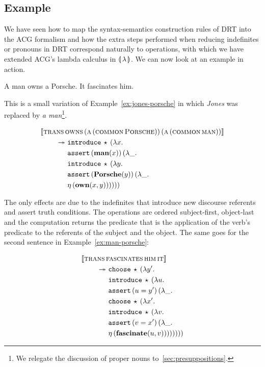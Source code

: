 \subsection{Example}
\label{ssec:dynamic-example}

We have seen how to map the syntax-semantics construction rules of DRT into
the ACG formalism and how the extra steps performed when reducing
indefinites or pronouns in DRT correspond naturally to operations, with
which we have extended ACG's lambda calculus in $\llparenthesis \, \lambda \, \rrparenthesis$. We can
now look at an example in action.

\begin{exe}
  \ex \label{ex:man-porsche} A man owns a Porsche. It fascinates him.
\end{exe}

This is a small variation of Example~\ref{ex:jones-porsche} in which
\emph{Jones} was replaced by \emph{a man}\footnote{We relegate the
  discussion of proper nouns to~\ref{sec:presuppositions}.}.

\begin{align*}
  \llbracket \textsc{trans}\,&\textsc{owns}\,(\textsc{a}\,(\textsc{common}\,\textsc{Porsche}))\,(\textsc{a}\,(\textsc{common}\,\textsc{man})) \rrbracket \\
  \twoheadrightarrow &\ \mathtt{introduce}\,\star\,(\lambda x.\,  \\
       &\ \mathtt{assert}\,(\textbf{man}(x))\,(\lambda \_.\,  \\
       &\ \mathtt{introduce}\,\star\,(\lambda y.\,  \\
       &\ \mathtt{assert}\,(\textbf{Porsche}(y))\,(\lambda \_.\,  \\
       &\ \eta\,(\textbf{own}(x, y))))))
\end{align*}

The only effects are due to the indefinites that introduce new discourse
referents and assert truth conditions. The operations are ordered
subject-first, object-last and the computation returns the predicate that
is the application of the verb's predicate to the referents of the subject
and the object. The same goes for the second sentence in
Example~\ref{ex:man-porsche}:

\begin{align*}
  \llbracket \textsc{trans}\,&\textsc{fascinates}\,\textsc{him}\,\textsc{it} \rrbracket \\
  \twoheadrightarrow &\ \mathtt{choose}\,\star\,(\lambda y'.\,  \\
       &\ \mathtt{introduce}\,\star\,(\lambda u.\,  \\
       &\ \mathtt{assert}\,(u = y')\,(\lambda \_.\,  \\
       &\ \mathtt{choose}\,\star\,(\lambda x'.\,  \\
       &\ \mathtt{introduce}\,\star\,(\lambda v.\,  \\
       &\ \mathtt{assert}\,(v = x')\,(\lambda \_.\,  \\
       &\ \eta\,(\textbf{fascinate}(u, v))))))))
\end{align*}

